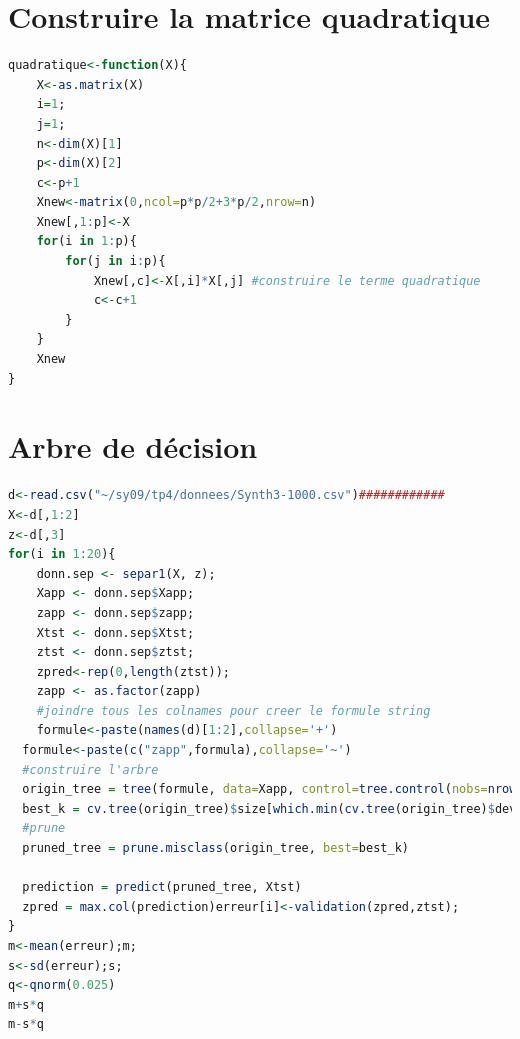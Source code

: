 \documentclass{article}
\begin{document}
\section{Construire la matrice quadratique}
\label{quadratique}
\begin{lstlisting}[language=R]
quadratique<-function(X){
	X<-as.matrix(X)
	i=1;
	j=1;
	n<-dim(X)[1]
	p<-dim(X)[2]
	c<-p+1
	Xnew<-matrix(0,ncol=p*p/2+3*p/2,nrow=n)
	Xnew[,1:p]<-X
	for(i in 1:p){
		for(j in i:p){
			Xnew[,c]<-X[,i]*X[,j] #construire le terme quadratique
			c<-c+1			
		}
	}
	Xnew
}

\end{lstlisting}


\section{Arbre de décision}
\label{arbre}
\begin{lstlisting}[language=R]
d<-read.csv("~/sy09/tp4/donnees/Synth3-1000.csv")############
X<-d[,1:2]
z<-d[,3]
for(i in 1:20){
	donn.sep <- separ1(X, z);
	Xapp <- donn.sep$Xapp;
	zapp <- donn.sep$zapp;
	Xtst <- donn.sep$Xtst;
	ztst <- donn.sep$ztst;
	zpred<-rep(0,length(ztst));
	zapp <- as.factor(zapp)
	#joindre tous les colnames pour creer le formule string
	formule<-paste(names(d)[1:2],collapse='+')
  formule<-paste(c("zapp",formula),collapse='~')
  #construire l'arbre  
  origin_tree = tree(formule, data=Xapp, control=tree.control(nobs=nrow(Xapp), mindev = 0.0001))
  best_k = cv.tree(origin_tree)$size[which.min(cv.tree(origin_tree)$dev)]
  #prune
  pruned_tree = prune.misclass(origin_tree, best=best_k)
    
  prediction = predict(pruned_tree, Xtst)
  zpred = max.col(prediction)erreur[i]<-validation(zpred,ztst);
}
m<-mean(erreur);m;
s<-sd(erreur);s;
q<-qnorm(0.025)
m+s*q
m-s*q

\end{lstlisting}
\end{document}
